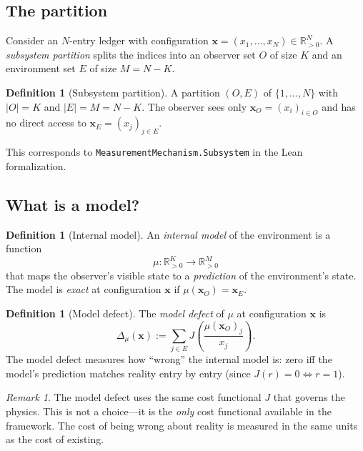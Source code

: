 \documentclass[11pt,a4paper]{article}
\theoremstyle{plain}
\theoremstyle{definition}
\newtheorem{definition}[theorem]{Definition}
\theoremstyle{remark}
\newtheorem{remark}[theorem]{Remark}
\newcommand{\Rp}{\mathbb{R}_{>0}}
\newcommand{\Jcost}{J}
\begin{document}
\subsection{The partition}

Consider an $N$-entry ledger with configuration
$\mathbf{x} = (x_1, \ldots, x_N) \in \Rp^N$.  A \emph{subsystem
partition} splits the indices into an observer set $O$ of size $K$ and
an environment set $E$ of size $M = N - K$.

\begin{definition}[Subsystem partition]
A partition $(O, E)$ of $\{1, \ldots, N\}$ with $|O| = K$ and
$|E| = M = N - K$.  The observer sees only
$\mathbf{x}_O = (x_i)_{i \in O}$ and has no direct access to
$\mathbf{x}_E = (x_j)_{j \in E}$.
\end{definition}

This corresponds to \texttt{MeasurementMechanism.Subsystem} in the
Lean formalization.

\subsection{What is a model?}

\begin{definition}[Internal model]
\label{def:model}
An \emph{internal model} of the environment is a function
\[
  \mu : \Rp^K \to \Rp^M
\]
that maps the observer's visible state to a \emph{prediction} of the
environment's state.  The model is \emph{exact} at configuration
$\mathbf{x}$ if $\mu(\mathbf{x}_O) = \mathbf{x}_E$.
\end{definition}

\begin{definition}[Model defect]
\label{def:model-defect}
The \emph{model defect} of $\mu$ at configuration $\mathbf{x}$ is
\[
  \Delta_\mu(\mathbf{x})
  := \sum_{j \in E} \Jcost\!\left(\frac{\mu(\mathbf{x}_O)_j}{x_j}\right).
\]
The model defect measures how ``wrong'' the internal model is: zero iff
the model's prediction matches reality entry by entry (since
$\Jcost(r) = 0 \iff r = 1$).
\end{definition}

\begin{remark}
The model defect uses the same cost functional $\Jcost$ that governs
the physics.  This is not a choice---it is the \emph{only} cost
functional available in the framework.  The cost of being wrong about
reality is measured in the same units as the cost of existing.
\end{remark}
\end{document}
